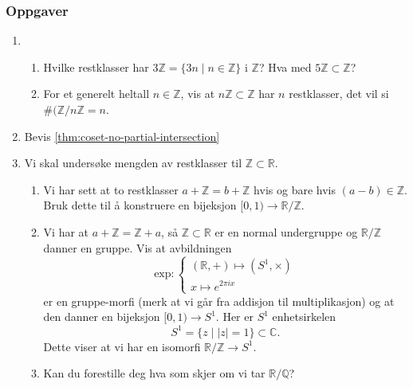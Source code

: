 \subsubsection*{Oppgaver}

\begin{enumerate}
    \item
        \begin{enumerate}
            \item Hvilke restklasser har $3\mathbb Z = \{3n \mid n\in \mathbb Z\}$
                i $\mathbb Z$? Hva med $5\mathbb Z\subset \mathbb Z$?
            \item For et generelt heltall $n\in \mathbb Z$,
                vis at $n\mathbb Z\subset \mathbb Z$ har $n$ restklasser,
                det vil si $\#(\mathbb Z / n\mathbb Z = n$.
        \end{enumerate}
    \item Bevis \cref{thm:coset-no-partial-intersection}
    \item Vi skal undersøke mengden av restklasser til $\mathbb Z\subset \mathbb R$.
        \begin{enumerate}
            \item Vi har sett at to restklasser $a + \mathbb Z = b + \mathbb Z$
                hvis og bare hvis $(a - b)\in \mathbb Z$.
                Bruk dette til å konstruere en bijeksjon
                $[0,1)\to \mathbb R / \mathbb Z$.
            \item Vi har at $a + \mathbb Z = \mathbb Z + a$,
                så $\mathbb Z\subset \mathbb R$ er en normal undergruppe
                og $\mathbb R / \mathbb Z$ danner en gruppe.
                Vis at avbildningen
                \[
                    \mathrm{exp}\colon \begin{cases}
                        (\mathbb R, +)\mapsto (S^1,\times)\\
                        x\mapsto e^{2\pi i x}
                    \end{cases}
                \]
                er en gruppe-morfi (merk at vi går fra addisjon til multiplikasjon)
                og at den danner en bijeksjon $[0,1)\to S^1$.
                Her er $S^1$ enhetsirkelen
                \[
                    S^1 = \{z\mid |z| = 1\}\subset \mathbb C.
                \]
                Dette viser at vi har en isomorfi $\mathbb R / \mathbb Z \to S^1$.
            \item Kan du forestille deg hva som skjer om vi tar
                $\mathbb R / \mathbb Q$?
        \end{enumerate}
\end{enumerate}

